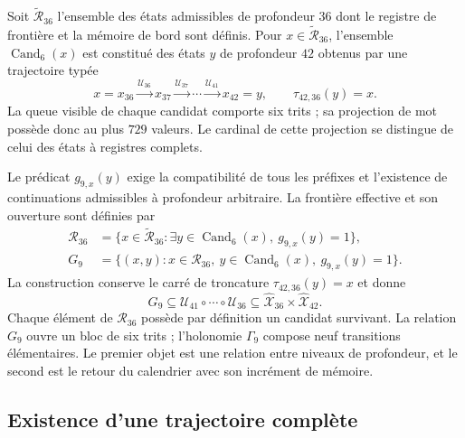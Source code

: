 Soit $\widetilde{\mathcal R}_{36}$ l’ensemble des états admissibles de profondeur $36$ dont le registre de frontière et la mémoire de bord sont définis. Pour $x\in\widetilde{\mathcal R}_{36}$, l’ensemble $\operatorname{Cand}_6(x)$ est constitué des états $y$ de profondeur $42$ obtenus par une trajectoire typée
\[
 x=x_{36}\xrightarrow{\mathcal U_{36}}x_{37}
 \xrightarrow{\mathcal U_{37}}\cdots
 \xrightarrow{\mathcal U_{41}}x_{42}=y,
 \qquad \tau_{42,36}(y)=x.
\]
La queue visible de chaque candidat comporte six trits ; sa projection de mot possède donc au plus $729$ valeurs. Le cardinal de cette projection se distingue de celui des états à registres complets.

Le prédicat $g_{9,x}(y)$ exige la compatibilité de tous les préfixes et l’existence de continuations admissibles à profondeur arbitraire. La frontière effective et son ouverture sont définies par
\begin{align*}
 \mathcal R_{36}
 &=\{x\in\widetilde{\mathcal R}_{36}:
      \exists y\in\operatorname{Cand}_6(x),\ g_{9,x}(y)=1\},\\
 G_9&=\{(x,y):x\in\mathcal R_{36},\
                y\in\operatorname{Cand}_6(x),\ g_{9,x}(y)=1\}.
\end{align*}
La construction conserve le carré de troncature $\tau_{42,36}(y)=x$ et donne
\[
 G_9\subseteq\mathcal U_{41}\circ\cdots\circ\mathcal U_{36}
 \subseteq\widehat{\mathcal X}_{36}\times\widehat{\mathcal X}_{42}.
\]
Chaque élément de $\mathcal R_{36}$ possède par définition un candidat survivant. La relation $G_9$ ouvre un bloc de six trits ; l’holonomie $\Gamma_9$ compose neuf transitions élémentaires. Le premier objet est une relation entre niveaux de profondeur, et le second est le retour du calendrier avec son incrément de mémoire.

\subsection{Existence d’une trajectoire complète}

